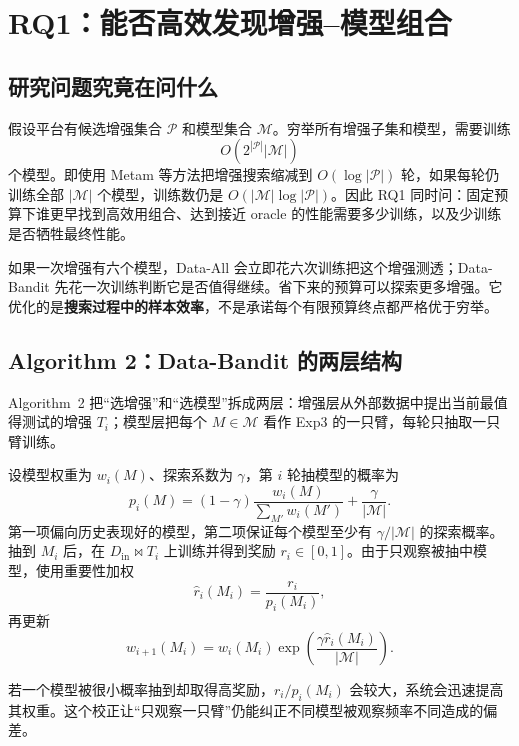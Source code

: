 \documentclass[11pt,a4paper]{ctexart}
\begin{document}
\section{RQ1：能否高效发现增强--模型组合}
\subsection{研究问题究竟在问什么}
假设平台有候选增强集合 $\mathcal P$ 和模型集合 $\mathcal M$。穷举所有增强子集和模型，需要训练
\[
O\!\left(2^{|\mathcal P|}|\mathcal M|\right)
\]
个模型。即使用 Metam 等方法把增强搜索缩减到 $O(\log|\mathcal P|)$ 轮，如果每轮仍训练全部 $|\mathcal M|$ 个模型，训练数仍是 $O(|\mathcal M|\log|\mathcal P|)$。因此 RQ1 同时问：固定预算下谁更早找到高效用组合、达到接近 oracle 的性能需要多少训练，以及少训练是否牺牲最终性能。

\begin{intuition}
如果一次增强有六个模型，Data-All 会立即花六次训练把这个增强测透；Data-Bandit 先花一次训练判断它是否值得继续。省下来的预算可以探索更多增强。它优化的是\textbf{搜索过程中的样本效率}，不是承诺每个有限预算终点都严格优于穷举。
\end{intuition}

\subsection{Algorithm 2：Data-Bandit 的两层结构}
Algorithm~2 把“选增强”和“选模型”拆成两层：增强层从外部数据中提出当前最值得测试的增强 $T_i$；模型层把每个 $M\in\mathcal M$ 看作 Exp3 的一只臂，每轮只抽取一只臂训练。

设模型权重为 $w_i(M)$、探索系数为 $\gamma$，第 $i$ 轮抽模型的概率为
\begin{equation}
p_i(M)=(1-\gamma)\frac{w_i(M)}{\sum_{M'}w_i(M')}+\frac{\gamma}{|\mathcal M|}.
\label{eq:exp3-prob}
\end{equation}
第一项偏向历史表现好的模型，第二项保证每个模型至少有 $\gamma/|\mathcal M|$ 的探索概率。抽到 $M_i$ 后，在 $D_{\mathrm{in}}\Join T_i$ 上训练并得到奖励 $r_i\in[0,1]$。由于只观察被抽中模型，使用重要性加权
\[
\widehat r_i(M_i)=\frac{r_i}{p_i(M_i)},
\]
再更新
\begin{equation}
w_{i+1}(M_i)=w_i(M_i)\exp\!\left(\frac{\gamma\widehat r_i(M_i)}{|\mathcal M|}\right).
\label{eq:exp3-update}
\end{equation}

\begin{intuition}
若一个模型被很小概率抽到却取得高奖励，$r_i/p_i(M_i)$ 会较大，系统会迅速提高其权重。这个校正让“只观察一只臂”仍能纠正不同模型被观察频率不同造成的偏差。
\end{intuition}
\end{document}
